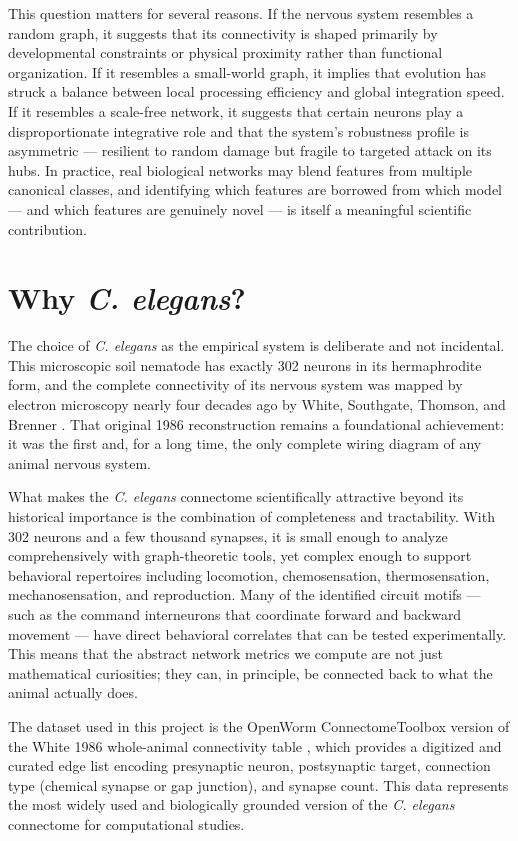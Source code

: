 \documentclass[12pt,a4paper]{report}
\begin{document}
This question matters for several reasons. If the nervous system resembles a random graph, it suggests that its connectivity is shaped primarily by developmental constraints or physical proximity rather than functional organization. If it resembles a small-world graph, it implies that evolution has struck a balance between local processing efficiency and global integration speed. If it resembles a scale-free network, it suggests that certain neurons play a disproportionate integrative role and that the system's robustness profile is asymmetric — resilient to random damage but fragile to targeted attack on its hubs. In practice, real biological networks may blend features from multiple canonical classes, and identifying which features are borrowed from which model — and which features are genuinely novel — is itself a meaningful scientific contribution.

\section{Why \textit{C. elegans}?}

The choice of \textit{C. elegans} as the empirical system is deliberate and not incidental. This microscopic soil nematode has exactly 302 neurons in its hermaphrodite form, and the complete connectivity of its nervous system was mapped by electron microscopy nearly four decades ago by White, Southgate, Thomson, and Brenner \cite{white1986structure}. That original 1986 reconstruction remains a foundational achievement: it was the first and, for a long time, the only complete wiring diagram of any animal nervous system.

What makes the \textit{C. elegans} connectome scientifically attractive beyond its historical importance is the combination of completeness and tractability. With 302 neurons and a few thousand synapses, it is small enough to analyze comprehensively with graph-theoretic tools, yet complex enough to support behavioral repertoires including locomotion, chemosensation, thermosensation, mechanosensation, and reproduction. Many of the identified circuit motifs — such as the command interneurons that coordinate forward and backward movement — have direct behavioral correlates that can be tested experimentally. This means that the abstract network metrics we compute are not just mathematical curiosities; they can, in principle, be connected back to what the animal actually does.

The dataset used in this project is the OpenWorm ConnectomeToolbox version of the White 1986 whole-animal connectivity table \cite{openwormtoolbox}, which provides a digitized and curated edge list encoding presynaptic neuron, postsynaptic target, connection type (chemical synapse or gap junction), and synapse count. This data represents the most widely used and biologically grounded version of the \textit{C. elegans} connectome for computational studies.
\end{document}

